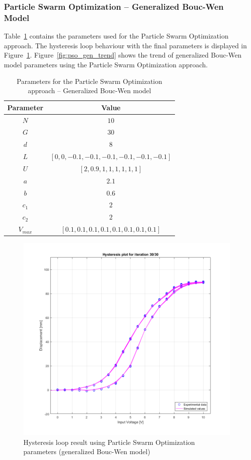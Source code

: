 \subsubsection{Particle Swarm Optimization -- Generalized Bouc-Wen Model}

Table~\ref{tab:pso_gen_params} contains the parameters used for the
Particle Swarm Optimization approach.
The hysteresis loop behaviour with the final parameters is displayed
in Figure~\ref{fig:pso_gen_final}.
Figure~\ref{fig:pso_gen_trend} shows the trend of generalized Bouc-Wen model parameters
using the Particle Swarm Optimization approach.

\begin{table}[H]
	\centering
	\begin{tabular}{c c}
		\toprule
		\textbf{Parameter} & \textbf{Value} \\ \toprule
		$N$			& $10$ \\
		$G$			& $30$ \\
		$d$			& $8$  \\
		$L$			& $\left[0, 0, -0.1, -0.1, -0.1, -0.1, -0.1, -0.1\right]$ \\
		$U$			& $\left[2, 0.9, 1, 1, 1, 1, 1, 1 \right]$ \\ 
		$a$			& $2.1$ \\
		$b$			& $0.6$ \\ 
		$c_1$		& $2$	\\
		$c_2$		& $2$	\\ 
		$V_{max}$	& $\left[0.1,0.1,0.1,0.1,0.1,0.1,0.1,0.1\right]$ \\ \bottomrule
	\end{tabular}
	\caption{Parameters for the Particle Swarm Optimization approach -- Generalized Bouc-Wen model}
	\label{tab:pso_gen_params}
\end{table}

\begin{figure}[H]
	\centering
	\includegraphics[width=0.85\linewidth]{Images/pso_gen_final}
	\caption{Hysteresis loop result using Particle Swarm Optimization parameters (generalized Bouc-Wen model)}
	\label{fig:pso_gen_final}
\end{figure}


